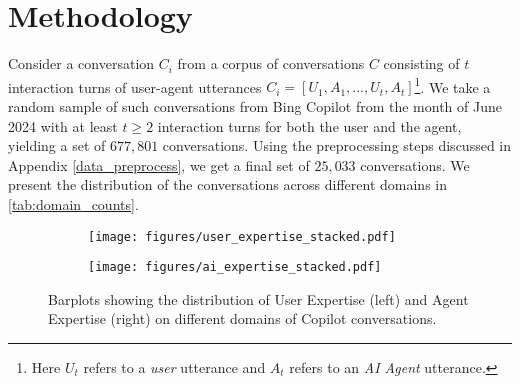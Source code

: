 \section{Methodology}

Consider a conversation $C_{i}$ from a corpus of conversations $C$ consisting of $t$ interaction turns of user-agent utterances $C_i = [U_1, A_1, ..., U_t, A_t]$\footnote{Here $U_t$ refers to a \textit{user} utterance and $A_t$ refers to an \textit{AI Agent} utterance.}. We take a random sample of such conversations from Bing Copilot from the month of June 2024 with at least $t \geq 2$ interaction turns for both the user and the agent, yielding a set of $677,801$ conversations. Using the preprocessing steps discussed in Appendix \ref{data_preprocess}, we get a final set of $25,033$ conversations. We present the distribution of the conversations across different domains in \autoref{tab:domain_counts}.


\begin{figure*}[ht!]
    \centering
    \begin{subfigure}[b]{0.49\linewidth}
        \texttt{[image: figures/user\_expertise\_stacked.pdf]}
        \caption{}
        \label{fig:user_dist}
    \end{subfigure}
    \begin{subfigure}[b]{0.49\linewidth}
        \texttt{[image: figures/ai\_expertise\_stacked.pdf]}
        \caption{}
        \label{fig:ai_dist}
    \end{subfigure}
    \caption{Barplots showing the distribution of User Expertise (left) and Agent Expertise (right) on different domains of Copilot conversations.}
\end{figure*}

